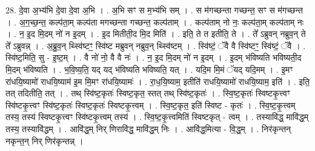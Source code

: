 \documentclass[17pt]{extarticle}
\begin{document}
28. दे॒वा अ॒भ्य॑भि दे॒वा दे॒वा अ॒भि । . अ॒भि सꣳ स म॒भ्य॑भि सम् । . स म॑गच्छन्ता गच्छन्त॒ सꣳ स म॑गच्छन्त । . अ॒ग॒च्छ॒न्त॒ कल्प॑ता॒म् कल्प॑ता मगच्छन्ता गच्छन्त॒ कल्प॑ताम् । . कल्प॑ताम् नो नः॒ कल्प॑ता॒म् कल्प॑ताम् नः । . न॒ इ॒द मि॒दम् नो॑ न इ॒दम् । . इ॒द मितीती॒द मि॒द मिति॑ । . इति॒ ते त इतीति॒ ते । . ते᳚ ऽब्रुवन् नब्रुव॒न् ते ते᳚ ऽब्रुवन्न् । . अ॒ब्रु॒व॒न् थ्स्वि॑ष्टꣳ॒॒ स्वि॑ष्ट मब्रुवन् नब्रुव॒न् थ्स्वि॑ष्टम् । . स्वि॑ष्टं॒ ॅवै वै स्वि॑ष्टꣳ॒॒ स्वि॑ष्टं॒ ॅवै । . स्वि॑ष्ट॒मिति॒ सु - इ॒ष्ट॒म् । . वै नो॑ नो॒ वै वै नः॑ । . न॒ इ॒द मि॒दम् नो॑ न इ॒दम् । . इ॒दम् भ॑विष्यति भविष्यती॒द मि॒दम् भ॑विष्यति । . भ॒वि॒ष्य॒ति॒ यद् यद् भ॑विष्यति भविष्यति॒ यत् । . यदि॒म मि॒मं ॅयद् यदि॒मम् । . इ॒मꣳ रा॑धयि॒ष्यामो॑ राधयि॒ष्याम॑ इ॒म मि॒मꣳ रा॑धयि॒ष्यामः॑ । . रा॒ध॒यि॒ष्याम॒ इतीति॑ राधयि॒ष्यामो॑ राधयि॒ष्याम॒ इति॑ । . इति॒ तत् तदितीति॒ तत् । . तथ् स्वि॑ष्ट॒कृतः॑ स्विष्ट॒कृत॒ स्तत् तथ् स्वि॑ष्ट॒कृतः॑ । . स्वि॒ष्ट॒कृतः॑ स्विष्टकृ॒त्त्वꣳ स्वि॑ष्टकृ॒त्त्वꣳ स्वि॑ष्ट॒कृतः॑ स्विष्ट॒कृतः॑ स्विष्टकृ॒त्त्वम् । . स्वि॒ष्ट॒कृत॒ इति॑ स्विष्ट - कृतः॑ । . स्वि॒ष्ट॒कृ॒त्त्वम् तस्य॒ तस्य॑ स्विष्टकृ॒त्त्वꣳ स्वि॑ष्टकृ॒त्त्वम् तस्य॑ । . स्वि॒ष्ट॒कृ॒त्त्वमिति॑ स्विष्टकृत् - त्वम् । . तस्यावि॑द्ध॒ मावि॑द्ध॒म् तस्य॒ तस्यावि॑द्धम् । . आवि॑द्ध॒म् निर् णिरावि॑द्ध॒ मावि॑द्ध॒म् निः । . आवि॑द्ध॒मित्या - वि॒द्ध॒म् । . निर॑कृन्तन् नकृन्त॒न् निर् णिर॑कृन्तन्न् । \newline
\end{document}
